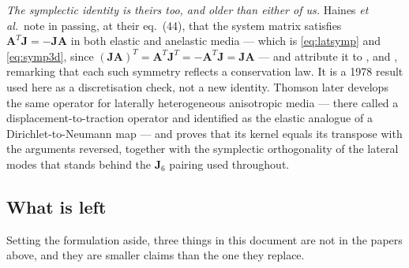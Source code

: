 \documentclass[11pt,a4paper]{article}
\newcommand{\bJ}{\mathbf{J}}
\newcommand{\bA}{\mathbf{A}}
\begin{document}
\emph{The symplectic identity is theirs too, and older than either of us.}
Haines \emph{et al.}\ note in passing, at their eq.~(44), that the system matrix
satisfies $\bA^{T}\bJ = -\bJ\bA$ in both elastic and anelastic media --- which
is \eqref{eq:latsymp} and \eqref{eq:symp3d}, since
$(\bJ\bA)^{T} = \bA^{T}\bJ^{T} = -\bA^{T}\bJ = \bJ\bA$ --- and attribute it to
\cite{kennett1978}, \cite{chapman1994} and \cite{hainesdehoop1996}, remarking that
each such symmetry reflects a conservation law.  It is a 1978
result used here as a discretisation check, not a new identity.  Thomson
\cite{thomson2015b} later develops the same operator for laterally heterogeneous
anisotropic media --- there called a displacement-to-traction operator and
identified as the elastic analogue of a Dirichlet-to-Neumann map --- and proves
that its kernel equals its transpose with the arguments reversed, together with
the symplectic orthogonality of the lateral modes that stands behind the $\bJ_6$
pairing used throughout.

\subsection{What is left}

Setting the formulation aside, three things in this document are not in the
papers above, and they are smaller claims than the one they replace.
\end{document}
